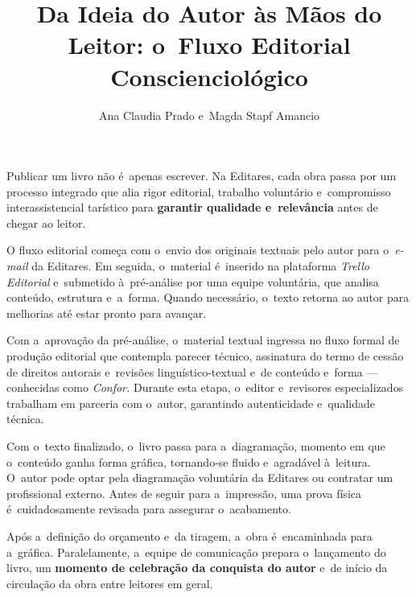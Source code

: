 \documentclass{gescons}
\author{Ana Claudia Prado e~Magda Stapf Amancio}
\title{Da Ideia do Autor às Mãos do Leitor: o~Fluxo Editorial Conscienciológico}
\begin{document}
    \makeentrevistatitle


    


Publicar um livro não é~apenas escrever. Na Editares, cada obra passa por um processo integrado que alia rigor editorial, trabalho voluntário e~compromisso interassistencial tarístico para \textbf{garantir qualidade e~relevância} antes de chegar ao leitor.

O fluxo editorial começa com o~envio dos originais textuais pelo autor para o~\emph{e-mail} da Editares. Em seguida, o~material é~inserido na plataforma \emph{Trello Editorial} e~submetido à~pré-análise por uma equipe voluntária, que analisa conteúdo, estrutura e~a~forma. Quando necessário, o~texto retorna ao autor para melhorias até estar pronto para avançar.

Com a~aprovação da pré-análise, o~material textual ingressa no fluxo formal de produção editorial que contempla parecer técnico, assinatura do termo de cessão de direitos autorais e~revisões linguístico-textual e~de conteúdo e~forma --- conhecidas como \emph{Confor.} Durante esta etapa, o~editor e~revisores especializados trabalham em parceria com o~autor, garantindo autenticidade e~qualidade técnica.

Com o~texto finalizado, o~livro passa para a~diagramação, momento em que o~conteúdo ganha forma gráfica, tornando-se fluido e~agradável à~leitura. O~autor pode optar pela diagramação voluntária da Editares ou contratar um profissional externo. Antes de seguir para a~impressão, uma prova física é~cuidadosamente revisada para assegurar o~acabamento.

Após a~definição do orçamento e~da tiragem, a~obra é~encaminhada para a~gráfica. Paralelamente, a~equipe de comunicação prepara o~lançamento do livro, um \textbf{momento de celebração da conquista do autor} e~de início da circulação da obra entre leitores em geral.
\end{document}
